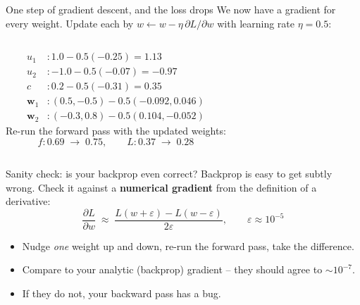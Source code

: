\documentclass[aspectratio=169]{beamer}
\begin{document}
\begin{frame}{One step of gradient descent, and the loss drops}
  We now have a gradient for every weight. Update each by $w \leftarrow w - \eta\,\partial
  L/\partial w$ with learning rate $\eta = 0.5$:
  \vfill
  \begin{columns}[T]
    \footnotesize
    \begin{align*}
      u_1 &: 1.0 - 0.5(-0.25) = 1.13\\
      u_2 &: -1.0 - 0.5(-0.07) = -0.97\\
      c &: 0.2 - 0.5(-0.31) = 0.35\\
      \mathbf{w}_1 &: (0.5,-0.5) - 0.5(-0.092,0.046)\\
      \mathbf{w}_2 &: (-0.3,0.8) - 0.5(0.104,-0.052)
    \end{align*}
    Re-run the forward pass with the updated weights:
    \[
      f: 0.69 \;\to\; 0.75, \qquad L: 0.37 \;\to\; 0.28
    \]
  \end{columns}
\end{frame}

\begin{frame}{Sanity check: is your backprop even correct?}
  Backprop is easy to get subtly wrong. Check it against a \textbf{numerical gradient} from
  the definition of a derivative:
  \[
    \frac{\partial L}{\partial w} \;\approx\; \frac{L(w+\varepsilon) - L(w-\varepsilon)}{2\varepsilon},
    \qquad \varepsilon \approx 10^{-5}
  \]
  \begin{itemize}\small
    \item Nudge \emph{one} weight up and down, re-run the forward pass, take the difference.
    \item Compare to your analytic (backprop) gradient -- they should agree to $\sim 10^{-7}$.
    \item If they do not, your backward pass has a bug.
  \end{itemize}
  \vfill
\end{frame}
\end{document}

